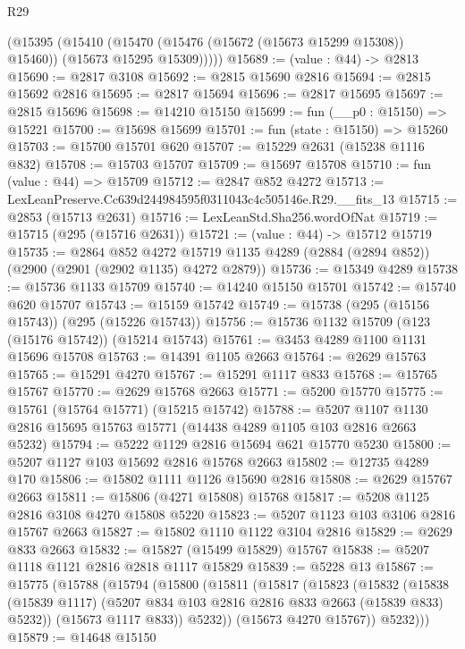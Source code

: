 \begin{lexlean}{R29}
\begin{coremodule}
        (@15395
          (@15410
            (@15470 (@15476 (@15672 (@15673 @15299 @15308)) @15460))
            (@15673 @15295 @15309)))))
@15689 := (value : @44) -> @2813
@15690 := @2817 @3108
@15692 := @2815 @15690 @2816
@15694 := @2815 @15692 @2816
@15695 := @2817 @15694
@15696 := @2817 @15695
@15697 := @2815 @15696
@15698 := @14210 @15150
@15699 := fun (__p0 : @15150) => @15221
@15700 := @15698 @15699
@15701 := fun (state : @15150) => @15260
@15703 := @15700 @15701 @620
@15707 := @15229 @2631 (@15238 @1116 @832)
@15708 := @15703 @15707
@15709 := @15697 @15708
@15710 := fun (value : @44) => @15709
@15712 := @2847 @852 @4272
@15713 := LexLeanPreserve.Cc639d244984595f0311043c4c505146e.R29.__fits_13
@15715 := @2853 (@15713 @2631)
@15716 := LexLeanStd.Sha256.wordOfNat
@15719 := @15715 (@295 (@15716 @2631))
@15721 := (value : @44) -> @15712 @15719
@15735 := @2864
    @852
    @4272
    @15719
    @1135
    @4289
    (@2884 (@2894 @852))
    (@2900 (@2901 (@2902 @1135) @4272 @2879))
@15736 := @15349 @4289
@15738 := @15736 @1133 @15709
@15740 := @14240 @15150 @15701
@15742 := @15740 @620 @15707
@15743 := @15159 @15742
@15749 := @15738 (@295 (@15156 @15743)) (@295 (@15226 @15743))
@15756 := @15736 @1132 @15709 (@123 (@15176 @15742)) (@15214 @15743)
@15761 := @3453 @4289 @1100 @1131 @15696 @15708
@15763 := @14391 @1105 @2663
@15764 := @2629 @15763
@15765 := @15291 @4270
@15767 := @15291 @1117 @833
@15768 := @15765 @15767
@15770 := @2629 @15768 @2663
@15771 := @5200 @15770
@15775 := @15761 (@15764 @15771) (@15215 @15742)
@15788 := @5207 @1107 @1130 @2816 @15695 @15763 @15771 (@14438 @4289 @1105 @103 @2816 @2663 @5232)
@15794 := @5222 @1129 @2816 @15694 @621 @15770 @5230
@15800 := @5207 @1127 @103 @15692 @2816 @15768 @2663
@15802 := @12735 @4289 @170
@15806 := @15802 @1111 @1126 @15690 @2816
@15808 := @2629 @15767 @2663
@15811 := @15806 (@4271 @15808) @15768
@15817 := @5208 @1125 @2816 @3108 @4270 @15808 @5220
@15823 := @5207 @1123 @103 @3106 @2816 @15767 @2663
@15827 := @15802 @1110 @1122 @3104 @2816
@15829 := @2629 @833 @2663
@15832 := @15827 (@15499 @15829) @15767
@15838 := @5207 @1118 @1121 @2816 @2818 @1117 @15829
@15839 := @5228 @13
@15867 := @15775
    (@15788
      (@15794
        (@15800
          (@15811
            (@15817
              (@15823
                (@15832
                  (@15838
                    (@15839 @1117)
                    (@5207 @834 @103 @2816 @2816 @833 @2663 (@15839 @833) @5232))
                  (@15673 @1117 @833))
                @5232))
            (@15673 @4270 @15767))
          @5232)))
@15879 := @14648
    @15150

\end{coremodule}
\end{lexlean}
